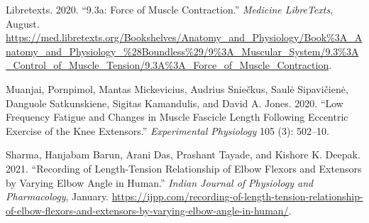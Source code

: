 \documentclass[
]{article}
\newlength{\cslhangindent}
\newlength{\cslentryspacingunit} %
\newenvironment{CSLReferences}[2] %
 {%
  \setlength{\parindent}{0pt}
  \ifodd #1
  \let\oldpar\par
  \def\par{\hangindent=\cslhangindent\oldpar}
  \fi
  \setlength{\parskip}{#2\cslentryspacingunit}
 }%
 {}
\begin{document}
\hypertarget{refs}{}
\begin{CSLReferences}{1}{0}
\leavevmode{}%
Libretexts. 2020. {``9.3a: Force of Muscle Contraction.''}
\emph{Medicine LibreTexts}, August.
\url{https://med.libretexts.org/Bookshelves/Anatomy_and_Physiology/Book\%3A_Anatomy_and_Physiology_\%28Boundless\%29/9\%3A_Muscular_System/9.3\%3A_Control_of_Muscle_Tension/9.3A\%3A_Force_of_Muscle_Contraction}.

\leavevmode{}%
Muanjai, Pornpimol, Mantas Mickevicius, Audrius Sniečkus, Saulė
Sipavičienė, Danguole Satkunskiene, Sigitas Kamandulis, and David A.
Jones. 2020. {``Low Frequency Fatigue and Changes in Muscle Fascicle
Length Following Eccentric Exercise of the Knee Extensors.''}
\emph{Experimental Physiology} 105 (3): 502--10.

\leavevmode{}%
Sharma, Hanjabam Barun, Arani Das, Prashant Tayade, and Kishore K.
Deepak. 2021. {``Recording of Length-Tension Relationship of Elbow
Flexors and Extensors by Varying Elbow Angle in Human.''} \emph{Indian
Journal of Physiology and Pharmacology}, January.
\url{https://ijpp.com/recording-of-length-tension-relationship-of-elbow-flexors-and-extensors-by-varying-elbow-angle-in-human/}.

\end{CSLReferences}
\end{document}
